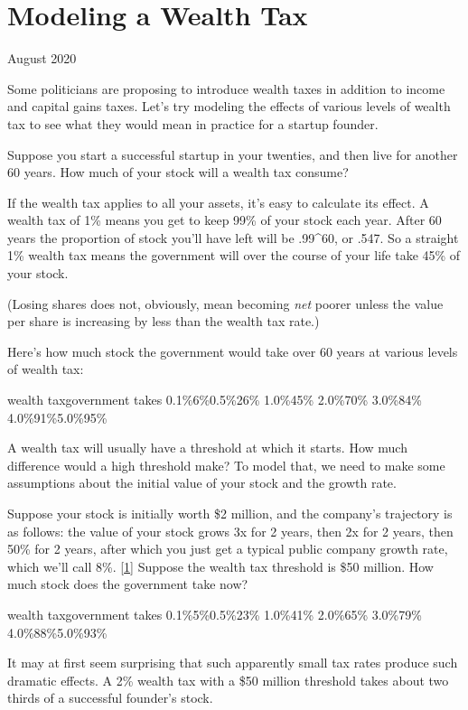 \chapter{Modeling a Wealth Tax}



August 2020

Some politicians are proposing to introduce wealth taxes in addition
to income and capital gains taxes. Let's try modeling the effects of various levels
of wealth tax to see what they would mean in practice for a startup
founder.

Suppose you start a successful startup in your twenties, and then
live for another 60 years. How much of your stock will a wealth tax
consume?

If the wealth tax applies to all your assets, it's easy to
calculate its effect. A wealth tax of 1\% means you get to keep
99\% of your stock each year. After 60 years the proportion
of stock you'll have left will be .99\textasciicircum{}60, or .547. So a
straight 1\% wealth tax means the government will over the
course of your life take 45\% of your stock.

(Losing shares does not, obviously, mean becoming \emph{net}
poorer unless the value per share is increasing by less than the 
wealth tax rate.)

Here's how much stock the government would take over 60
years at various levels of wealth tax:


wealth taxgovernment takes
0.1\%6\%0.5\%26\%
1.0\%45\%
2.0\%70\%
3.0\%84\%
4.0\%91\%5.0\%95\%



A wealth tax will usually have a threshold at which it starts.
How much difference would a high threshold make? To model that,
we need to make some assumptions about the initial value of
your stock and the growth rate.

Suppose your stock is initially
worth \$2 million, and the company's trajectory is as follows:
the value of your stock grows 3x for 2 years, then 2x for 2 years,
then 50\% for 2 years, after
which you just get a typical public company growth rate,
which we'll call 8\%. 
[\href{\#f1n}{1}]
Suppose the wealth tax threshold is
\$50 million. How much stock does the government take now?


wealth taxgovernment takes
0.1\%5\%0.5\%23\%
1.0\%41\%
2.0\%65\%
3.0\%79\%
4.0\%88\%5.0\%93\%



It may at first seem surprising that such apparently small tax rates
produce such dramatic effects. A 2\% wealth tax with a \$50 million
threshold takes about two thirds of a successful founder's stock.

